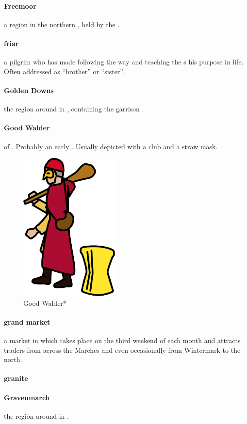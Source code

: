 \paragraph{Freemoor} a region in the northern , held by the .
\paragraph{friar} a pilgrim who has made following the way and teaching the s his purpose in life. Often addressed as “brother” or “sister”.
\paragraph{Golden Downs} the region around  in , containing the garrison .
\paragraph{Good Walder}  of . Probably an early . Usually depicted with a club and a straw mask.\begin{figure} \centering \includegraphics[width=5cm]{encyclopedia/Walder} \caption{Good Walder*}\end{figure}
\paragraph{grand market} a market in  which takes place on the third weekend of each month and attracts traders from across the Marches and even occasionally from Wintermark to the north. 
\paragraph{granite} 
\paragraph{Gravenmarch} the region around  in .
